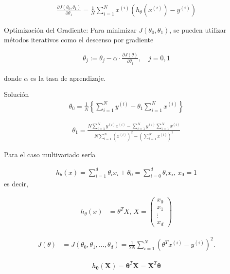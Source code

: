 \documentclass[12pt]{article}
\begin{document}
\begin{eqnarray}
\frac{\partial J(\theta_0, \theta_1)}{\partial \theta_1} = \frac{1}{N} \sum_{i=1}^{N} x^{(i)} \left( h_\theta(x^{(i)}) - y^{(i)} \right)
\end{eqnarray}

Optimización del Gradiente: Para minimizar $J(\theta_0, \theta_1)$, se pueden utilizar métodos iterativos como el descenso por gradiente

\begin{eqnarray}
\theta_j := \theta_j - \alpha \cdot \frac{\partial J(\theta)}{\partial \theta_j}, \quad j = 0, 1
\end{eqnarray}

donde $\alpha$ es la tasa de aprendizaje.

Soluci\'on
\begin{eqnarray}
\theta_{0}= \frac{1}{N} \left\{\sum_{i=1}^{N} y^{(i)}-\theta_{1} \sum_{i=1}^{N}  x^{(i)}\right\}
\end{eqnarray}

\begin{eqnarray}
\theta_{1}= \frac{N\sum_{i=1}^{N} y^{(i)}x^{(i)} -\sum_{i=1}^{N} y^{(i)}\sum_{i=1}^{N} x^{(i)}}{N\sum_{i=1}^{N} (x^{(i)})^{2}-(\sum_{i=1}^{N} x^{(i)})^{2}}
\end{eqnarray}

Para el caso multivariado ser\'ia

\begin{eqnarray}
h_{\theta}\left(x\right)=\sum_{i=1}^{d}\theta_{i}x_{i}+\theta_{0}=\sum_{i=0}^{d}\theta_{i}x_{i}\textrm{, }x_{0}=1
\end{eqnarray}
es decir,

\begin{eqnarray}
h_{\theta}(x) &= \theta^{T} X\textrm{, } X = \begin{pmatrix} x_0 \\ x_1 \\ \vdots \\ x_d \end{pmatrix}
\end{eqnarray}

\begin{eqnarray}
J(\theta) &= J(\theta_0, \theta_1, \ldots, \theta_d) = \frac{1}{2N} \sum_{i=1}^{N} \left( \theta^{T} x^{(i)} - y^{(i)} \right)^2.
\end{eqnarray}


\begin{eqnarray}
h_{\mathbf{\theta}}(\mathbf{X}) = \mathbf{\theta}^{T} \mathbf{X} = \mathbf{X}^{T} \mathbf{\theta}
\end{eqnarray}
\end{document}

